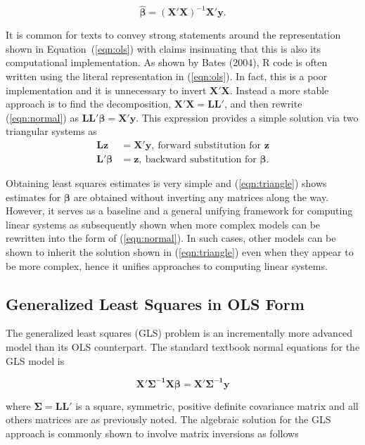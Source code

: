 \documentclass[12pt]{article}
\begin{document}
\begin{equation}
\label{eqn:ols}
\widehat{\bm{\beta}} = \bm{(X'X)}^{-1} \bm{X'y}.
\end{equation}

It is common for texts to convey strong statements around the representation shown in Equation~(\ref{eqn:ols}) with claims insinuating that this is also its computational implementation. As shown by Bates (2004), R code is often written using the literal representation in (\ref{eqn:ols}). In fact, this is a poor implementation and it is unnecessary to invert $\bm{X'X}$. Instead a more stable approach is to find the decomposition, $\bm{X'X} = \bm{LL'}$, and then rewrite (\ref{eqn:normal}) as $\bm{LL'\beta} = \bm{X'y}$. This expression provides a simple solution via two triangular systems as
\begin{align}
\label{eqn:triangle}
\bm{Lz}  & =  \bm{X'y}, \ \text{forward substitution for $\bm{z}$}\\
\bm{L'\beta}  &=  \bm{z}, \ \text{backward substitution for $\bm{\beta}$} \nonumber.  
\end{align}

Obtaining least squares estimates is very simple and (\ref{eqn:triangle}) shows estimates for $\bm{\beta}$ are obtained without inverting any matrices along the way. However, it serves as a baseline and a general unifying framework for computing linear systems as subsequently shown when more complex models can be rewritten into the form of (\ref{eqn:normal}). In such cases, other models can be shown to inherit the solution shown in (\ref{eqn:triangle}) even when they appear to be more complex, hence it unifies approaches to computing linear systems.

\subsection*{Generalized Least Squares in OLS Form}

The generalized least squares (GLS) problem is an incrementally more advanced model than its OLS counterpart. The standard textbook normal equations for the GLS model is

\begin{equation}
\bm{X'\Sigma^{-1}X}\bm{\beta} = \bm{X'\Sigma^{-1}y}
\label{eqn:glsNormal}
\end{equation}

\noindent where $\bm{\Sigma} = \bm{LL'}$ is a square, symmetric, positive definite covariance matrix and all others matrices are as previously noted. The algebraic solution for the GLS approach is commonly shown to involve matrix inversions as follows
\end{document}
